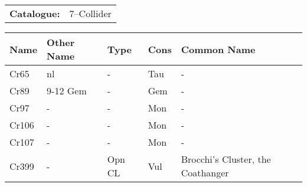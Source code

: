 \begin{tabular}{ p{0.9in} p{1.3in}}
{\bf Catalogue:} & 7--Collider \\ 
\end{tabular}
\centering 
\begin{longtable}{ p{0.7in}  p{1.0in}  p{0.6in}  p{0.9in}  p{4.0in} }
\hline 
{\bf Name} & {\bf Other Name} & {\bf Type} & {\bf Cons} & {\bf Common Name} \\ 
\hline 
Cr65 & nl & - & Tau & - \\ 
Cr89 & 9-12 Gem & - & Gem & - \\ 
Cr97 & - & - & Mon & - \\ 
Cr106 & - & - & Mon & - \\ 
Cr107 & - & - & Mon & - \\ 
Cr399 & - & Opn CL & Vul & Brocchi's Cluster, the Coathanger \\ 
\hline 
\end{longtable} 
